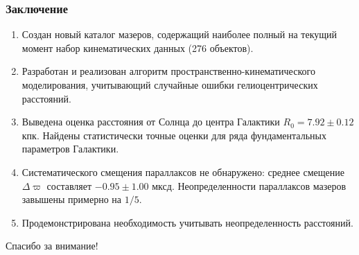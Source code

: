 \documentclass{beamer}
\begin{document}
\begin{frame}
\vspace{-0.6em}

\end{frame}

\begin{frame}
\frametitle{Заключение}
\begin{enumerate}
  \item Создан новый каталог мазеров, содержащий наиболее полный на текущий момент набор кинематических данных (276 объектов).
  \item Разработан и реализован алгоритм пространственно-кинематического моделирования, учитывающий случайные ошибки гелиоцентрических расстояний.
  \item Выведена оценка расстояния от Солнца до центра Галактики $ R_0 = 7.92 \pm 0.12 $ кпк. Найдены статистически точные оценки для ряда фундаментальных параметров Галактики.
  \item Систематического смещения параллаксов не обнаружено: среднее смещение $ \Delta\varpi $ составляет $ −0.95 \pm 1.00 $ мксд. Неопределенности параллаксов мазеров завышены примерно на $ 1/5 $.
  \item Продемонстрирована необходимость учитывать неопределенность расстояний.
\end{enumerate}
\end{frame}

\begin{frame}
\centering\Huge
Спасибо за внимание!
\end{frame}
\end{document}
